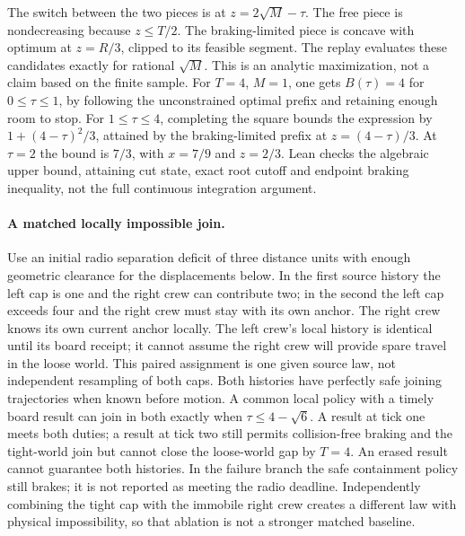 \documentclass{article}
\begin{document}
The switch between the two pieces is at $z=2\sqrt M-\tau$. The free piece is nondecreasing because $z\le T/2$. The braking-limited piece is concave with optimum at $z=R/3$, clipped to its feasible segment. The replay evaluates these candidates exactly for rational $\sqrt M$. This is an analytic maximization, not a claim based on the finite sample. For $T=4$, $M=1$, one gets $B(\tau)=4$ for $0\le\tau\le1$, by following the unconstrained optimal prefix and retaining enough room to stop. For $1\le\tau\le4$, completing the square bounds the expression by $1+(4-\tau)^2/3$, attained by the braking-limited prefix at $z=(4-\tau)/3$. At $\tau=2$ the bound is $7/3$, with $x=7/9$ and $z=2/3$. Lean checks the algebraic upper bound, attaining cut state, exact root cutoff and endpoint braking inequality, not the full continuous integration argument.

\paragraph{A matched locally impossible join.}
Use an initial radio separation deficit of three distance units with enough geometric clearance for the displacements below. In the first source history the left cap is one and the right crew can contribute two; in the second the left cap exceeds four and the right crew must stay with its own anchor. The right crew knows its own current anchor locally. The left crew's local history is identical until its board receipt; it cannot assume the right crew will provide spare travel in the loose world. This paired assignment is one given source law, not independent resampling of both caps. Both histories have perfectly safe joining trajectories when known before motion. A common local policy with a timely board result can join in both exactly when $\tau \le 4-\sqrt6$. A result at tick one meets both duties; a result at tick two still permits collision-free braking and the tight-world join but cannot close the loose-world gap by $T=4$. An erased result cannot guarantee both histories. In the failure branch the safe containment policy still brakes; it is not reported as meeting the radio deadline. Independently combining the tight cap with the immobile right crew creates a different law with physical impossibility, so that ablation is not a stronger matched baseline.
\end{document}

